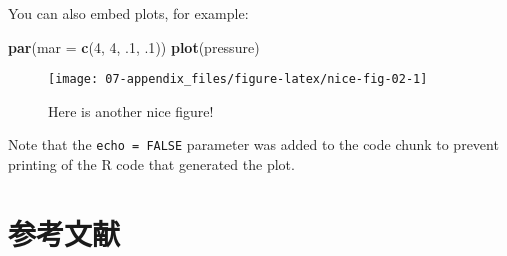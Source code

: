 \documentclass[
  lang=cn,
  11pt,
  scheme=chinese,
  chinesefont=nofont,
  bibstyle=apalike]{elegantbook}
\newenvironment{Shaded}{\begin{snugshade}}{\end{snugshade}}
\newcommand{\DataTypeTok}[1]{\textcolor[rgb]{0.13,0.29,0.53}{#1}}
\newcommand{\DecValTok}[1]{\textcolor[rgb]{0.00,0.00,0.81}{#1}}
\newcommand{\FloatTok}[1]{\textcolor[rgb]{0.00,0.00,0.81}{#1}}
\newcommand{\KeywordTok}[1]{\textcolor[rgb]{0.13,0.29,0.53}{\textbf{#1}}}
\newcommand{\NormalTok}[1]{#1}
\begin{document}
You can also embed plots, for example:

\begin{Shaded}
\begin{Highlighting}[]
\KeywordTok{par}\NormalTok{(}\DataTypeTok{mar =} \KeywordTok{c}\NormalTok{(}\DecValTok{4}\NormalTok{, }\DecValTok{4}\NormalTok{, }\FloatTok{.1}\NormalTok{, }\FloatTok{.1}\NormalTok{))}
\KeywordTok{plot}\NormalTok{(pressure)}
\end{Highlighting}
\end{Shaded}

\begin{figure}

{\centering \texttt{[image: 07-appendix\_files/figure-latex/nice-fig-02-1]} 

}

\caption{Here is another nice figure!}\label{fig:nice-fig-02}
\end{figure}

Note that the \texttt{echo\ =\ FALSE} parameter was added to the code chunk to prevent printing of the R code that generated the plot.

\hypertarget{References}{%
\chapter*{参考文献}\label{References}}
\end{document}
